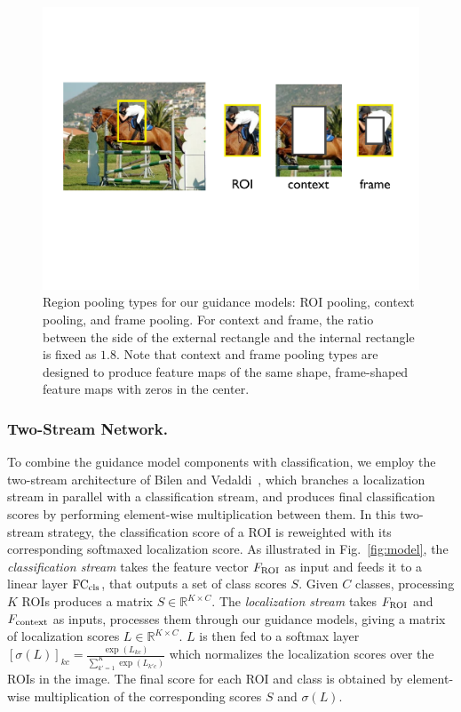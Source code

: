 \begin{figure}[t] \includegraphics[width=\textwidth, trim={1mm 7.5cm 1mm 5cm},
clip]{images/roitransforms} \caption[small]{Region pooling types for our guidance models: ROI pooling, context pooling, and frame pooling. For context and frame, the ratio between the side of the external rectangle and the internal rectangle is fixed as 
$1.8$. Note that context and frame pooling types are designed to produce feature maps of the same shape, \ie frame-shaped feature maps with zeros in the center.} \label{fig:roitransforms} \end{figure}



\subsubsection{Two-Stream Network.} To combine the guidance model components
with classification, we employ the two-stream architecture of Bilen and
Vedaldi~\cite{Bilen:2015uo}, which branches a localization stream in parallel
with a classification stream, and produces final classification scores by
performing element-wise multiplication between them. In this two-stream strategy, the
classification score of a ROI is reweighted with its corresponding softmaxed
localization score. As illustrated in Fig.~\ref{fig:model}, the {\em classification stream} takes the feature vector  
$F_{\rm ROI}$ as input and feeds it to a linear layer ${\rm FC_{cls}}$, that outputs a set of class
scores $S$. Given $C$ classes, processing $K$ ROIs produces a matrix $S \in \mathbb{R}^{K \times C}$. The {\em localization stream} takes $F_{\rm ROI}$ and $F_{\rm context}$ as inputs, processes them through our guidance models, giving a matrix of localization
scores $L \in \mathbb{R}^{K \times C}$. $L$ is then fed to a softmax layer $ [ \sigma(L) ]_{kc} = \frac{\exp(L_{kc})}{\sum_{k'=1}^{K}{\exp(L_{k'c})}}$ which normalizes the localization scores over the ROIs in the image. 
The final score for each ROI and class is obtained by element-wise multiplication of the corresponding scores $S$ and $\sigma(L)$. 


